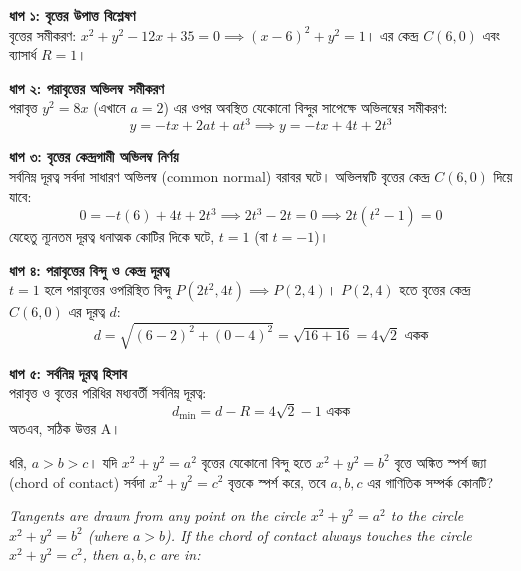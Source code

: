\documentclass[12pt, a4paper]{article}
\begin{document}
\begin{tcolorbox}[solutionbox={সমাধান (Solution)}]
    \noindent
    \textbf{ধাপ ১: বৃত্তের উপাত্ত বিশ্লেষণ} \\
    বৃত্তের সমীকরণ: $x^2 + y^2 - 12x + 35 = 0 \implies (x - 6)^2 + y^2 = 1$। 
    এর কেন্দ্র $C(6, 0)$ এবং ব্যাসার্ধ $R = 1$।
    
    \vspace{0.5em}
    \noindent\textbf{ধাপ ২: পরাবৃত্তের অভিলম্ব সমীকরণ} \\
    পরাবৃত্ত $y^2 = 8x$ (এখানে $a = 2$) এর ওপর অবস্থিত যেকোনো বিন্দুর সাপেক্ষে অভিলম্বের সমীকরণ:
    \[ y = -tx + 2at + at^3 \implies y = -tx + 4t + 2t^3 \]
    
    \vspace{0.5em}
    \noindent\textbf{ধাপ ৩: বৃত্তের কেন্দ্রগামী অভিলম্ব নির্ণয়} \\
    সর্বনিম্ন দূরত্ব সর্বদা সাধারণ অভিলম্ব (common normal) বরাবর ঘটে। অভিলম্বটি বৃত্তের কেন্দ্র $C(6, 0)$ দিয়ে যাবে:
    \[ 0 = -t(6) + 4t + 2t^3 \implies 2t^3 - 2t = 0 \implies 2t(t^2 - 1) = 0 \]
    যেহেতু ন্যূনতম দূরত্ব ধনাত্মক কোটির দিকে ঘটে, $t = 1$ (বা $t = -1$)।
    
    \vspace{0.5em}
    \noindent\textbf{ধাপ ৪: পরাবৃত্তের বিন্দু ও কেন্দ্র দূরত্ব} \\
    $t = 1$ হলে পরাবৃত্তের ওপরিস্থিত বিন্দু $P(2t^2, 4t) \implies P(2, 4)$। 
    $P(2, 4)$ হতে বৃত্তের কেন্দ্র $C(6, 0)$ এর দূরত্ব $d$:
    \[ d = \sqrt{(6-2)^2 + (0-4)^2} = \sqrt{16 + 16} = 4\sqrt{2} \text{ একক} \]
    
    \vspace{0.5em}
    \noindent\textbf{ধাপ ৫: সর্বনিম্ন দূরত্ব হিসাব} \\
    পরাবৃত্ত ও বৃত্তের পরিধির মধ্যবর্তী সর্বনিম্ন দূরত্ব:
    \[ d_{\min} = d - R = 4\sqrt{2} - 1 \text{ একক} \]
    অতএব, সঠিক উত্তর A।
\end{tcolorbox}
\begin{tcolorbox}[questionbox={প্রশ্ন (Question) 15}]
    \noindent
    ধরি, $a > b > c$। যদি $x^2 + y^2 = a^2$ বৃত্তের যেকোনো বিন্দু হতে $x^2 + y^2 = b^2$ বৃত্তে অঙ্কিত স্পর্শ জ্যা (chord of contact) সর্বদা $x^2 + y^2 = c^2$ বৃত্তকে স্পর্শ করে, তবে $a, b, c$ এর গাণিতিক সম্পর্ক কোনটি?
    
    \vspace{0.8em}
    \begin{english}
    \noindent\textit{\color{darkgray}
    Tangents are drawn from any point on the circle $x^2 + y^2 = a^2$ to the circle $x^2 + y^2 = b^2$ (where $a > b$). If the chord of contact always touches the circle $x^2 + y^2 = c^2$, then $a, b, c$ are in:
    }
    \end{english}
\end{tcolorbox}
\end{document}
